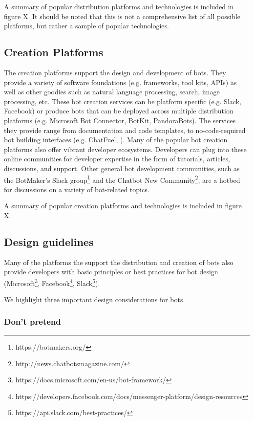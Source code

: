 \documentclass{sig-alternate}
\begin{document}
	A summary of popular distribution platforms and technologies is included in figure X.  It should be noted that this is not a comprehensive list of all possible platforms, but rather a sample of popular technologies.

	\subsection{Creation Platforms}

	The creation platforms support the design and development of bots. They provide a variety of software foundations (e.g. frameworks, tool kits, APIs) as well as other goodies such as natural language processing, search, image processing, etc. These bot creation services can be platform specific (e.g. Slack, Facebook) or produce bots that can be deployed across multiple distribution platforms (e.g. Microsoft Bot Connector, BotKit, PandoraBots). The services they provide range from documentation and code templates, to no-code-required bot building interfaces (e.g. ChatFuel, ). 
	Many of the popular bot creation platforms also offer vibrant developer ecosystems. Developers can plug into these online communities for developer expertise in the form of tutorials, articles, discussions, and support.  Other general bot development communities, such as the BotMaker's Slack group\footnote{https://botmakers.org/} and the Chatbot New Community\footnote{http://news.chatbotsmagazine.com/}, are a hotbed for discussions on a variety of bot-related topics.

	A summary of popular creation platforms and technologies is included in figure X.

	\subsection{Design guidelines}

	Many of the platforms the support the distribution and creation of bots also provide developers with basic principles or best practices for bot design (Microsoft\footnote{https://docs.microsoft.com/en-us/bot-framework/}, Facebook\footnote{https://developers.facebook.com/docs/messenger-platform/design-resources}, Slack\footnote{https://api.slack.com/best-practices/}).

	We highlight three important design considerations for bots.

	\subsubsection{Don't pretend}
\end{document}
